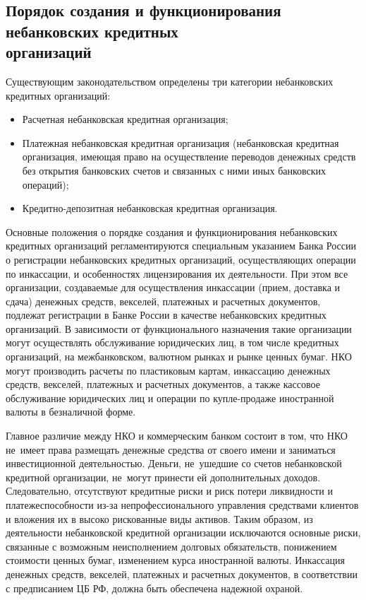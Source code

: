 \documentclass[a4paper,12pt,fleqn]{article} %
\begin{document}
\subsection{Порядок создания и функционирования небанковских кредитных \\организаций}

Существующим законодательством определены три категории небанковских кредитных организаций: 

\begin{itemize}
	\item Расчетная небанковская кредитная организация;
	\item Платежная небанковская кредитная организация (небанковская кредитная организация, имеющая право на осуществление переводов денежных средств без открытия банковских счетов и связанных с ними иных банковских операций);
	\item Кредитно-депозитная небанковская кредитная организация.
\end{itemize}

Основные положения о порядке создания и функционирования небанковских кредитных организаций регламентируются специальным указанием Банка России о регистрации небанковских кредитных организаций, осуществляющих операции по инкассации, и особенностях лицензирования их деятельности. При этом все   организации,   создаваемые  для  осуществления инкассации (прием,  доставка  и  сдача)  денежных средств,  векселей, платежных и расчетных документов,  подлежат регистрации в Банке России в качестве небанковских кредитных организаций. В зависимости от функционального назначения такие организации могут осуществлять обслуживание юридических лиц, в том числе кредитных организаций, на межбанковском, валютном рынках и рынке ценных бумаг. НКО могут производить расчеты по пластиковым картам, инкассацию денежных средств, векселей, платежных и расчетных документов, а также кассовое обслуживание юридических лиц и операции по купле-продаже иностранной валюты в безналичной форме. 

Главное различие между НКО и коммерческим банком состоит в том, что НКО не~имеет права размещать денежные средства от своего имени и заниматься инвестиционной деятельностью. Деньги, не~ушедшие со счетов небанковской кредитной организации, не~могут принести ей дополнительных доходов. Следовательно, отсутствуют кредитные риски и риск потери ликвидности и платежеспособности из-за непрофессионального управления средствами клиентов и вложения их в высоко рискованные виды активов. Таким образом, из деятельности небанковской кредитной организации исключаются основные риски, связанные с возможным неисполнением долговых обязательств, понижением стоимости ценных бумаг, изменением курса иностранной валюты. Инкассация денежных средств,  векселей,  платежных и расчетных документов, в соответствии с предписанием ЦБ РФ, должна  быть  обеспечена  надежной  охраной.  
\end{document}
